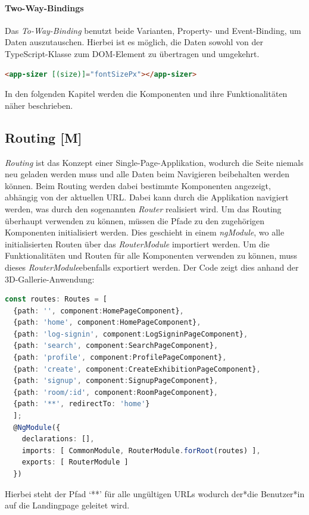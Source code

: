 \paragraph{Two-Way-Bindings}
Das \emph{To-Way-Binding} benutzt beide Varianten, Property- und Event-Binding, um Daten auszutauschen. Hierbei ist es möglich, die Daten sowohl von der TypeScript-Klasse zum DOM-Element zu übertragen und umgekehrt. \cite{AngularTwoWayBinding}
\begin{lstlisting}[caption={{Beispiel für Two-Way-Bindings \cite{AngularTwoWayBinding}}},language=HTML,label=lst:impl:two-way-bindings]
    <app-sizer [(size)]="fontSizePx"></app-sizer>
\end{lstlisting}
In den folgenden Kapitel werden die Komponenten und ihre Funktionalitäten näher beschrieben. 

\subsection{Routing [M]}\label{sec:Routing}
\emph{Routing} ist das Konzept einer Single-Page-Applikation, wodurch die Seite niemals neu geladen werden muss und alle Daten beim Navigieren beibehalten werden können. Beim Routing werden dabei bestimmte Komponenten angezeigt, abhängig von der aktuellen URL. Dabei kann durch die Applikation navigiert werden, was durch den sogenannten \emph{Router} realisiert wird.  Um das Routing überhaupt verwenden zu können, müssen die Pfade zu den zugehörigen Komponenten initialisiert werden. Dies geschieht in einem \emph{ngModule}, wo alle initialisierten Routen über das \emph{RouterModule} importiert werden. Um die Funktionalitäten und Routen für alle Komponenten verwenden zu können, muss dieses \emph{RouterModule}ebenfalls exportiert werden. Der Code zeigt dies anhand der 3D-Gallerie-Anwendung: \cite{AngularBuch}
\begin{lstlisting}[caption={Routing in der 3D-Gallery},language=TypeScript,label=lst:impl:routing]
const routes: Routes = [
  {path: '', component:HomePageComponent},
  {path: 'home', component:HomePageComponent},
  {path: 'log-signin', component:LogSigninPageComponent},
  {path: 'search', component:SearchPageComponent},
  {path: 'profile', component:ProfilePageComponent},
  {path: 'create', component:CreateExhibitionPageComponent},
  {path: 'signup', component:SignupPageComponent},
  {path: 'room/:id', component:RoomPageComponent},
  {path: '**', redirectTo: 'home'}
  ];
  @NgModule({
    declarations: [],
    imports: [ CommonModule, RouterModule.forRoot(routes) ],
    exports: [ RouterModule ]
  })

\end{lstlisting}
Hierbei steht der Pfad ‘**’ für alle ungültigen URLs wodurch der*die Benutzer*in auf die Landingpage geleitet wird.

